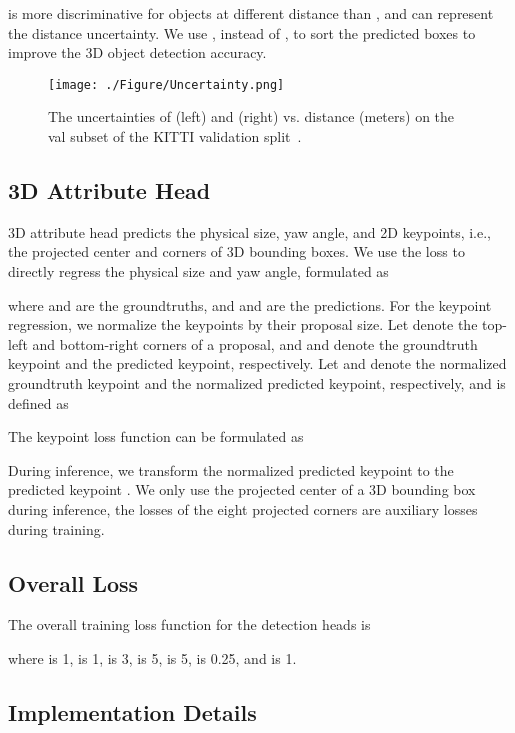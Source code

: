 \documentclass[10pt,twocolumn,letterpaper]{article}
\begin{document}
 is more discriminative for objects at different distance than , and  can represent the distance uncertainty. We use , instead of , to sort the predicted boxes to improve the 3D object detection accuracy.

\begin{figure}
\centering
\texttt{[image: ./Figure/Uncertainty.png]}
\caption{The uncertainties of  (left) and  (right) vs. distance  (meters) on the val subset of the KITTI validation split~\cite{DBLP:conf/nips/ChenKZBMFU15}. 
}
\label{fig:Uncertainty}
\vspace{-0.4cm}
\end{figure}

\subsection{3D Attribute Head}
3D attribute head predicts the physical size, yaw angle, and 2D keypoints, i.e., the projected center and corners of 3D bounding boxes. We use the  loss to directly regress the physical size and yaw angle, formulated as


where  and  are the groundtruths, and  and  are the predictions. For the keypoint regression, we normalize the keypoints by their proposal size. Let  denote the top-left and bottom-right corners of a proposal, and  and  denote the groundtruth keypoint and the predicted keypoint, respectively. Let  and  denote the normalized groundtruth keypoint and the normalized predicted keypoint, respectively, and  is defined as

The keypoint loss function can be formulated as

During inference, we transform the normalized predicted keypoint  to the predicted keypoint . We only use the projected center of a 3D bounding box during inference, the losses of the eight projected corners are auxiliary losses during training.

\subsection{Overall Loss} 
The overall training loss function for the detection heads is 

where  is \num{1},  is \num{1},  is \num{3},  is \num{5},  is \num{5},  is \num{0.25}, and  is \num{1}.

\subsection{Implementation Details} 
\end{document}

